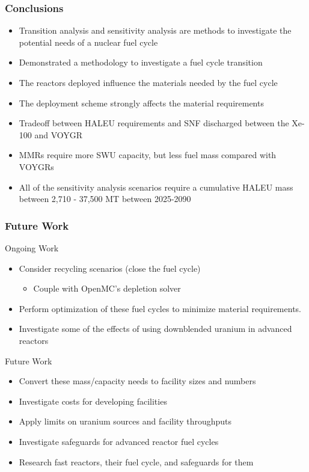 \begin{frame}
      \frametitle{Conclusions}
      \begin{itemize}
        \item Transition analysis and sensitivity analysis are methods
              to investigate the potential needs of a nuclear fuel cycle
        \item Demonstrated a methodology to investigate a fuel cycle transition
        \item<2-> The reactors deployed influence the materials needed by 
              the fuel cycle
        \item<2-> The deployment scheme strongly affects the material requirements
        \item<3-> Tradeoff between \gls{HALEU} requirements and \gls{SNF} 
              discharged between the Xe-100 and VOYGR
        \item<3-> \glspl{MMR} require more \gls{SWU} capacity, but less fuel mass
              compared with VOYGRs          
        \item<4-> All of the sensitivity analysis scenarios require a cumulative 
              \gls{HALEU} mass between 2,710 - 37,500 MT between 2025-2090       
      \end{itemize}
\end{frame}

\begin{frame}
  \frametitle{Future Work}
  \begin{block}{Ongoing Work}
    
  \begin{itemize}
    \item Consider recycling scenarios (close the fuel cycle)
    \begin{itemize}
      \item Couple \Cyclus with OpenMC's depletion solver
    \end{itemize}
    \item Perform optimization of these fuel cycles to minimize material
          requirements.
    \item Investigate some of the effects of using downblended uranium 
          in advanced reactors
  \end{itemize}
  \end{block}

  \pause
  \begin{block}{Future Work}
    \begin{itemize}
      \item Convert these mass/capacity needs to facility sizes and numbers
      \item Investigate costs for developing facilities
      \item Apply limits on uranium sources and facility throughputs
      \item<1-> Investigate safeguards for advanced reactor fuel cycles
      \item<1-> Research fast reactors, their fuel cycle, and safeguards for them
    \end{itemize}
  \end{block}
\end{frame}